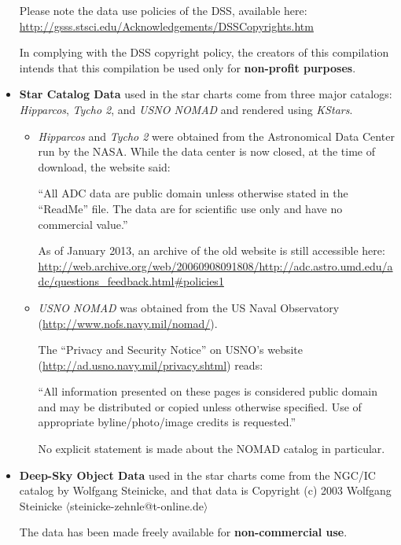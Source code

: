 \begin{itemize}
  Please note the data use policies of the DSS, available here:
  \url{http://gsss.stsci.edu/Acknowledgements/DSSCopyrights.htm}
  
  In complying with the DSS copyright policy, the creators of this
  compilation intends that this compilation be used only for
  \textbf{non-profit purposes}.

\item \textbf{Star Catalog Data} used in the star charts come from
  three major catalogs: \emph{Hipparcos}, \emph{Tycho 2}, and
  \emph{USNO NOMAD} and rendered using \emph{KStars}.

  \begin{itemize}
    \item \emph{Hipparcos} and \emph{Tycho 2} were obtained from the
      Astronomical Data Center run by the NASA. While the data center
      is now closed, at the time of download, the website said:

      ``All ADC data are public domain unless otherwise stated in the
      ``ReadMe'' file. The data are for scientific use only and have
      no commercial value.''

      As of January 2013, an archive of the old website is still
      accessible here:
      {\small \url{http://web.archive.org/web/20060908091808/http://adc.astro.umd.edu/adc/questions_feedback.html#policies1}}

    \item \emph{USNO NOMAD} was obtained from the US Naval Observatory
      (\url{http://www.nofs.navy.mil/nomad/}).

      The ``Privacy and Security Notice'' on USNO's website
      (\url{http://ad.usno.navy.mil/privacy.shtml}) reads:

      ``All information presented on these pages is considered public
      domain and may be distributed or copied unless otherwise
      specified. Use of appropriate byline/photo/image credits is
      requested.''

      No explicit statement is made about the NOMAD catalog in
      particular.
  \end{itemize}

\item \textbf{Deep-Sky Object Data} used in the star charts come from
  the NGC/IC catalog by Wolfgang Steinicke, and that data is Copyright
  (c) 2003 Wolfgang Steinicke
  $\langle$steinicke-zehnle@t-online.de$\rangle$

  The data has been made freely available for \textbf{non-commercial
    use}.


\end{itemize}
